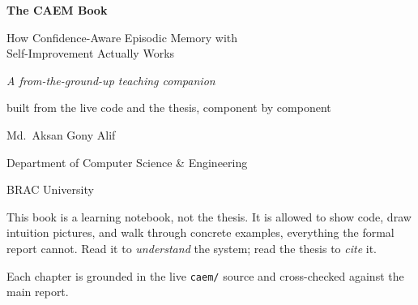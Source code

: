 \begin{titlepage}
\centering
\vspace*{3.5cm}

{\Huge\bfseries\sffamily The \textsc{CAEM} Book\par}
\vspace{0.8cm}
{\Large\sffamily How Confidence-Aware Episodic Memory with\\[2pt]
Self-Improvement Actually Works\par}

\vspace{1.2cm}
{\large\itshape A from-the-ground-up teaching companion\par}
{\normalsize built from the live code and the thesis, component by component\par}

\vspace{3cm}
{\large Md.\ Aksan Gony Alif\par}
{\normalsize Department of Computer Science \& Engineering\par}
{\normalsize BRAC University\par}

\vfill
{\small This book is a learning notebook, not the thesis. It is allowed to
show code, draw intuition pictures, and walk through concrete examples,
everything the formal report cannot. Read it to \emph{understand} the system;
read the thesis to \emph{cite} it.\par}
\vspace{0.5cm}
{\footnotesize Each chapter is grounded in the live \texttt{caem/} source and
cross-checked against the main report.\par}

\end{titlepage}
